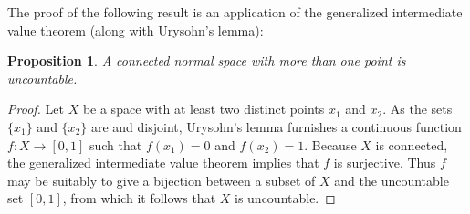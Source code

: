 \documentclass[12pt]{article}
\theoremstyle{plain}
\newtheorem*{prop*}{Proposition}
\newcommand{\set}[1]{\{#1\}}
\begin{document}
The proof of the following result is an application of the generalized intermediate value theorem (along with Urysohn's lemma):
\begin{prop*}
A connected normal space with more than one point is uncountable.
\end{prop*}
\begin{proof}
Let $X$ be a   space with at least two distinct points $x_1$ and $x_2$. As the sets $\set{x_1}$ and $\set{x_2}$ are  and disjoint, Urysohn's lemma furnishes a continuous function $f:X\rightarrow[0,1]$ such that $f(x_1)=0$ and $f(x_2)=1$. Because $X$ is connected, the generalized intermediate value theorem implies that $f$ is surjective. Thus $f$ may be suitably  to give a bijection between a subset of $X$ and the uncountable set $[0,1]$, from which it follows that $X$ is uncountable.
\end{proof}
\end{document}

